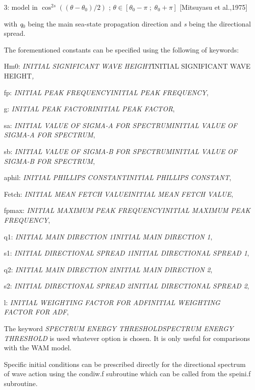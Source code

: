  3:  model in $\cos ^{2s} \left(\left(\theta -\theta _{0} \right)/2\right)$ ; $\theta \in \left[\theta _{0} -\pi \; ;\; \theta _{0} +\pi \right]$ [Mitsuyasu et al.,1975]

 with \textit{q${}_{0}$} being the main sea-state propagation direction and \textit{s} being the directional spread.



 The forementioned constants can be specified using the following of keywords:

 Hm0: \textit{INITIAL SIGNIFICANT WAVE HEIGHT}INITIAL SIGNIFICANT WAVE HEIGHT\textit{,}

 fp:  \textit{INITIAL PEAK FREQUENCYINITIAL PEAK FREQUENCY},

 g:  \textit{INITIAL PEAK FACTORINITIAL PEAK FACTOR},

 sa:  \textit{INITIAL VALUE OF SIGMA-A FOR SPECTRUMINITIAL VALUE OF SIGMA-A FOR SPECTRUM},

 sb:  \textit{INITIAL VALUE OF SIGMA-B FOR SPECTRUMINITIAL VALUE OF SIGMA-B FOR SPECTRUM},

 aphil:  \textit{INITIAL PHILLIPS CONSTANTINITIAL PHILLIPS CONSTANT},

 Fetch:  \textit{INITIAL MEAN FETCH VALUEINITIAL MEAN FETCH VALUE},

 fpmax:  \textit{INITIAL MAXIMUM PEAK FREQUENCYINITIAL MAXIMUM PEAK FREQUENCY},

 q1:  \textit{INITIAL MAIN DIRECTION 1INITIAL MAIN DIRECTION 1},

 s1:  \textit{INITIAL DIRECTIONAL SPREAD 1INITIAL DIRECTIONAL SPREAD 1},

 q2:  \textit{INITIAL MAIN DIRECTION 2INITIAL MAIN DIRECTION 2},

 s2:  \textit{INITIAL DIRECTIONAL SPREAD 2INITIAL DIRECTIONAL SPREAD 2},

 l:  \textit{INITIAL WEIGHTING FACTOR FOR ADFINITIAL WEIGHTING FACTOR FOR ADF},



 The keyword \textit{SPECTRUM ENERGY THRESHOLDSPECTRUM ENERGY THRESHOLD} is used whatever option is chosen. It is only useful for comparisons with the WAM model.

 Specific initial conditions can be prescribed directly for the directional spectrum of wave action using the condiw.f subroutine which can be called from the speini.f subroutine.



